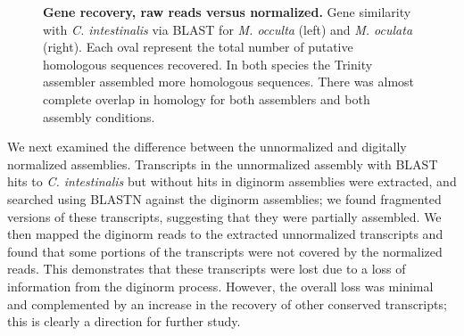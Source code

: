 \begin{figure}[!ht]
	\hfill
	\caption{\textbf{Gene recovery, raw reads versus normalized.} Gene similarity with \textit{C. intestinalis} via BLAST for \textit{M. occulta} (left) and \textit{M. oculata} (right). Each oval represent the total number of putative homologous sequences recovered. In both species the Trinity assembler assembled more homologous sequences. There was almost complete overlap in homology for both assemblers and both assembly conditions.}
	\label{fig:overlap}
\end{figure}
     
We next examined the difference between the unnormalized and digitally normalized assemblies. Transcripts in the unnormalized assembly with BLAST hits to \textit{C. intestinalis} but without hits in diginorm assemblies were extracted, and searched using BLASTN against the diginorm assemblies; we found fragmented versions of these transcripts, suggesting that they were partially assembled.  We then mapped the diginorm reads to the extracted unnormalized transcripts and found that some portions of the transcripts were not covered by the normalized reads. This demonstrates that these transcripts were lost due to a loss of information from the diginorm process.  However, the overall loss was minimal and complemented by an increase in the recovery of other conserved transcripts; this is clearly a direction for further study.
